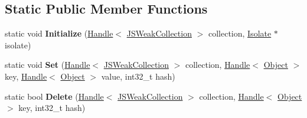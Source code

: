 \subsection*{Static Public Member Functions}
\begin{DoxyCompactItemize}
\item 
static void {\bfseries Initialize} (\hyperlink{classv8_1_1internal_1_1_handle}{Handle}$<$ \hyperlink{classv8_1_1internal_1_1_j_s_weak_collection}{J\+S\+Weak\+Collection} $>$ collection, \hyperlink{classv8_1_1internal_1_1_isolate}{Isolate} $\ast$isolate)\hypertarget{classv8_1_1internal_1_1_j_s_weak_collection_a553122e983caa4cc1b6de16d4d455693}{}\label{classv8_1_1internal_1_1_j_s_weak_collection_a553122e983caa4cc1b6de16d4d455693}

\item 
static void {\bfseries Set} (\hyperlink{classv8_1_1internal_1_1_handle}{Handle}$<$ \hyperlink{classv8_1_1internal_1_1_j_s_weak_collection}{J\+S\+Weak\+Collection} $>$ collection, \hyperlink{classv8_1_1internal_1_1_handle}{Handle}$<$ \hyperlink{classv8_1_1internal_1_1_object}{Object} $>$ key, \hyperlink{classv8_1_1internal_1_1_handle}{Handle}$<$ \hyperlink{classv8_1_1internal_1_1_object}{Object} $>$ value, int32\+\_\+t hash)\hypertarget{classv8_1_1internal_1_1_j_s_weak_collection_a2286836f893092b790d809b462f50ef8}{}\label{classv8_1_1internal_1_1_j_s_weak_collection_a2286836f893092b790d809b462f50ef8}

\item 
static bool {\bfseries Delete} (\hyperlink{classv8_1_1internal_1_1_handle}{Handle}$<$ \hyperlink{classv8_1_1internal_1_1_j_s_weak_collection}{J\+S\+Weak\+Collection} $>$ collection, \hyperlink{classv8_1_1internal_1_1_handle}{Handle}$<$ \hyperlink{classv8_1_1internal_1_1_object}{Object} $>$ key, int32\+\_\+t hash)\hypertarget{classv8_1_1internal_1_1_j_s_weak_collection_aa429c39e297d4809322baf09d890098f}{}\label{classv8_1_1internal_1_1_j_s_weak_collection_aa429c39e297d4809322baf09d890098f}

\end{DoxyCompactItemize}
